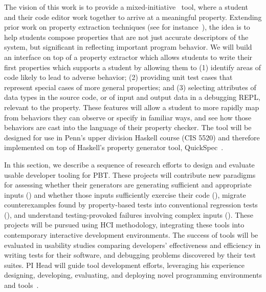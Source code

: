 The vision of this work is to provide a mixed-initiative~\cite{ref:allen1999mixed}
tool, where a student and their code editor work together to arrive at a
meaningful property. Extending prior work on property extraction techniques (see for
instance~\cite{ref:ammons2002mining, ref:le2018deep, ref:claessen2010quickspec,
smith_discovering_2017}), the idea is to help students compose properties that
are not just accurate descriptors of the system, but significant in reflecting
important program behavior. We will build an interface on top of a property
extractor which allows students to write their first properties which supports a
student by allowing them to (1) identify areas of code likely to lead to adverse behavior;
(2) providing unit test cases that represent special cases of more general
properties; and (3) selecting attributes of data types in the source code, or
of input and output data in a debugging REPL, relevant to the property. These
features will allow a student to more rapidly map from behaviors they can
observe or specify in familiar ways, and see how those behaviors are cast into
the language of their property checker.
%
The tool will be designed for use in Penn's upper division Haskell
course (CIS 5520) and therefore implemented on top of
Haskell's property
generator tool, QuickSpec~\cite{ref:claessen2010quickspec}.


\iflater{}\fi


In this section, we
describe a sequence of research efforts to design and evaluate usable developer
tooling for PBT. These projects will contribute new paradigms for assessing whether their generators are generating sufficient and
appropriate inputs () and whether those
inputs sufficiently exercise their code (), migrate
counterexamples found by property-based tests into conventional regression tests (),
and understand testing-provoked failures involving complex inputs
(). These projects will be pursued using HCI
methodology, integrating these tools into contemporary interactive development
environments. The success of tools will be evaluated in usability studies
comparing developers' effectiveness and efficiency in writing tests for their
software, and debugging problems discovered by their test suites.  PI Head will
guide tool development efforts, leveraging his
experience designing, developing, evaluating, and deploying novel programming
environments and
tools~\cite{ref:head2015tutorons,ref:suzuki2017tracediff,ref:head2017writing,ref:head2018when,ref:head2018interactive,ref:head2019managing,ref:head2020composing}.

